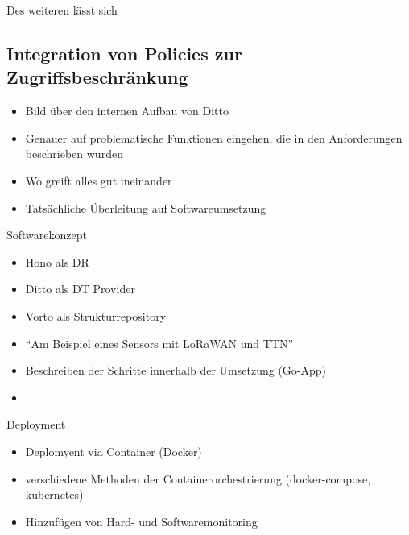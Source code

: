Des weiteren lässt sich 

\subsection{Integration von Policies zur Zugriffsbeschränkung}

\begin{itemize}
    \item Bild über den internen Aufbau von Ditto
    \item Genauer auf problematische Funktionen eingehen, die in den Anforderungen beschrieben wurden
    \item Wo greift alles gut ineinander
    \item Tatsächliche Überleitung auf Softwareumsetzung
\end{itemize}

\large{Softwarekonzept}
\normalsize
\begin{itemize}
    \item Hono als DR
    \item Ditto als DT Provider
    \item Vorto als Strukturrepository
    \item \enquote{Am Beispiel eines Sensors mit LoRaWAN und TTN}
    \item Beschreiben der Schritte innerhalb der Umsetzung (Go-App)
    \item 
\end{itemize}

\large{Deployment}
\normalsize
\begin{itemize}
    \item Deplomyent via Container (Docker)
    \item verschiedene Methoden der Containerorchestrierung (docker-compose, kubernetes)
    \item Hinzufügen von Hard- und Softwaremonitoring
\end{itemize}
